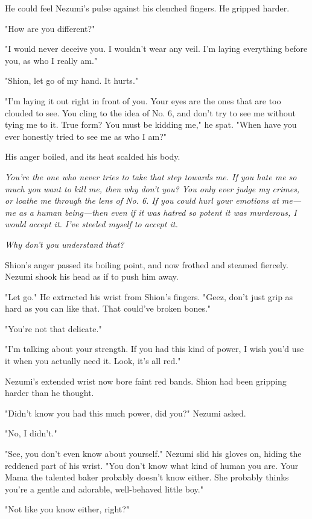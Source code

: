 He could feel Nezumi's pulse against his clenched fingers. He gripped
harder.

"How are you different?"

"I would never deceive you. I wouldn't wear any veil. I'm laying
everything before you, as who I really am."

"Shion, let go of my hand. It hurts."

"I'm laying it out right in front of you. Your eyes are the ones that
are too clouded to see. You cling to the idea of No. 6, and don't try to
see me without tying me to it. True form? You must be kidding me," he
spat. "When have you ever honestly tried to see me as who I am?"

His anger boiled, and its heat scalded his body.

\emph{You're the one who never tries to take that step towards me. If you hate
me so much you want to kill me, then why don't you? You only ever judge
my crimes, or loathe me through the lens of No. 6. If you could hurl
your emotions at me---me as a human being---then even if it was hatred so
potent it was murderous, I would accept it. I've steeled myself to
accept it.}

\emph{Why don't you understand that?}

Shion's anger passed its boiling point, and now frothed and steamed
fiercely. Nezumi shook his head as if to push him away.

"Let go." He extracted his wrist from Shion's fingers. "Geez, don't just
grip as hard as you can like that. That could've broken bones."

"You're not that delicate."

"I'm talking about your strength. If you had this kind of power, I wish
you'd use it when you actually need it. Look, it's all red."

Nezumi's extended wrist now bore faint red bands. Shion had been
gripping harder than he thought.

"Didn't know you had this much power, did you?" Nezumi asked.

"No, I didn't."

"See, you don't even know about yourself." Nezumi slid his gloves on,
hiding the reddened part of his wrist. "You don't know what kind of
human you are. Your Mama the talented baker probably doesn't know
either. She probably thinks you're a gentle and adorable, well-behaved
little boy."

"Not like you know either, right?"


